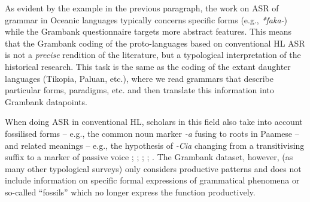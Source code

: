\documentclass[12pt,letterpaper]{article}
\begin{document}


As evident by the example in the previous paragraph, the work on ASR of grammar in Oceanic languages typically concerns specific forms (e.g., \emph{*faka-}) while the Grambank questionnaire targets more abstract features. This means that the Grambank coding of the proto-languages based on conventional HL ASR is not a \textit{precise} rendition of the literature, but a typological interpretation of the historical research. This task is the same as the coding of the extant daughter languages (Tikopia, Paluan, etc.), where we read grammars that describe particular forms, paradigms, etc. and then translate this information into Grambank datapoints. 

When doing ASR in conventional HL, scholars in this field also take into account fossilised forms -- e.g., the common noun marker \textit{-a} fusing to roots in Paamese \citep[141]{crowley1985common} -- and related meanings -- e.g., the hypothesis of \textit{-Cia} changing from a transitivising suffix to a marker of passive voice \citep{hale_1968}; \citep{hohepa_1967}; \citep{hohepa_1969}; \citep{chung1978}; \citep{jonsson1998}. The Grambank dataset, however, (as many other typological surveys) only considers productive patterns and does not include information on specific formal expressions of grammatical phenomena or so-called ``fossils'' which no longer express the function productively.


 
\end{document}
